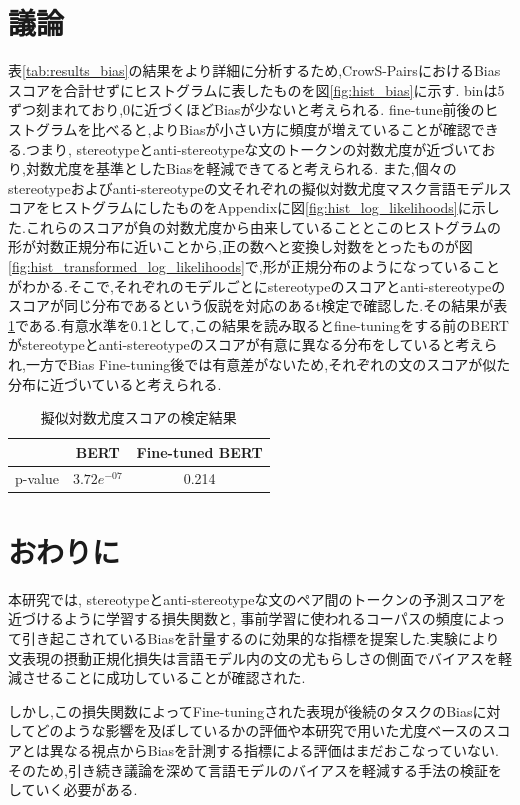 \documentclass[
  platex, dvipdfmx %
]{nlp2021}
\begin{document}
\section{議論}
表\ref{tab:results_bias}の結果をより詳細に分析するため,CrowS-PairsにおけるBiasスコアを合計せずにヒストグラムに表したものを図\ref{fig:hist_bias}に示す. binは5ずつ刻まれており,0に近づくほどBiasが少ないと考えられる. fine-tune前後のヒストグラムを比べると,よりBiasが小さい方に頻度が増えていることが確認できる.つまり, stereotypeとanti-stereotypeな文のトークンの対数尤度が近づいており,対数尤度を基準としたBiasを軽減できてると考えられる.
また,個々のstereotypeおよびanti-stereotypeの文それぞれの擬似対数尤度マスク言語モデルスコアをヒストグラムにしたものをAppendixに図\ref{fig:hist_log_likelihoods}に示した.これらのスコアが負の対数尤度から由来していることとこのヒストグラムの形が対数正規分布に近いことから,正の数へと変換し対数をとったものが図\ref{fig:hist_transformed_log_likelihoods}で,形が正規分布のようになっていることがわかる.そこで,それぞれのモデルごとにstereotypeのスコアとanti-stereotypeのスコアが同じ分布であるという仮説を対応のあるt検定で確認した.その結果が表\ref{tab:t_bias_scores}である.有意水準を0.1として,この結果を読み取るとfine-tuningをする前のBERTがstereotypeとanti-stereotypeのスコアが有意に異なる分布をしていると考えられ,一方でBias Fine-tuning後では有意差がないため,それぞれの文のスコアが似た分布に近づいていると考えられる.

\begin{table}[h]
\centering
\label{tab:t_bias_scores}
\begin{tabular}{lcc}
\hline
 &  BERT & Fine-tuned BERT \\
\hline
p-value & $3.72e^{-07}$ &  0.214 \\
\hline
\end{tabular}
\caption{擬似対数尤度スコアの検定結果}
\end{table}

\section{おわりに}
本研究では, stereotypeとanti-stereotypeな文のペア間のトークンの予測スコアを近づけるように学習する損失関数と, 事前学習に使われるコーパスの頻度によって引き起こされているBiasを計量するのに効果的な指標を提案した.実験により文表現の摂動正規化損失は言語モデル内の文の尤もらしさの側面でバイアスを軽減させることに成功していることが確認された.

しかし,この損失関数によってFine-tuningされた表現が後続のタスクのBiasに対してどのような影響を及ぼしているかの評価や本研究で用いた尤度ベースのスコアとは異なる視点からBiasを計測する指標による評価はまだおこなっていない.そのため,引き続き議論を深めて言語モデルのバイアスを軽減する手法の検証をしていく必要がある.
\end{document}
